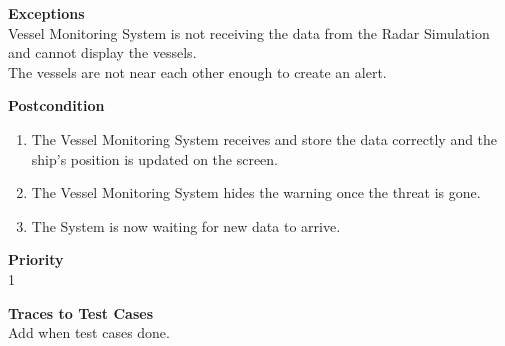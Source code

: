 \documentclass[12pt]{article}
\begin{document}
\noindent
{\bf Exceptions}\\
Vessel Monitoring System is not receiving the data from the Radar Simulation and cannot display the vessels.\\
The vessels are not near each other enough to create an alert.

\noindent
{\bf Postcondition}\\
\vspace*{-0.2in}
\begin{enumerate}
\item The Vessel Monitoring System receives and store the data correctly and the ship's position is updated on the screen.
\item The Vessel Monitoring System hides the warning once the threat is gone.
\item The System is now waiting for new data to arrive.
\end{enumerate}

\noindent
{\bf Priority}\\
1

\noindent
{\bf Traces to Test Cases}\\
Add when test cases done.
\end{document}

